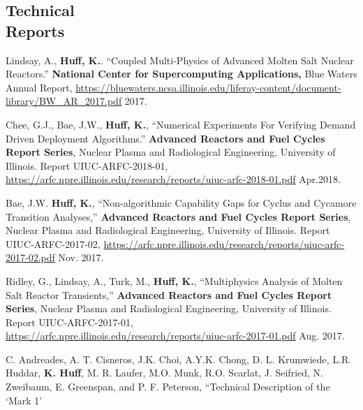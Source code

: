 \documentclass[margin,line]{resume}
\begin{document}
\begin{resume}
    \section{\mysidestyle Technical\\Reports}
    \begin{bibenum}
      \item Lindsay, A., \textbf{Huff, K.}. ``Coupled Multi-Physics of Advanced
              Molten Salt Nuclear Reactors.'' \textbf{National Center for
              Supercomputing Applications,} Blue Waters Annual Report,
              \url{https://bluewaters.ncsa.illinois.edu/liferay-content/document-library/BW_AR_2017.pdf}
              2017.
      \item Chee, G.J., Bae, J.W., \textbf{Huff, K.}, ``Numerical Experiments
              For Verifying Demand Driven Deployment Algorithms.''
              \textbf{Advanced Reactors and Fuel Cycles Report Series}, Nuclear Plasma and Radiological Engineering, University of Illinois.  Report
              UIUC-ARFC-2018-01,
              \url{https://arfc.npre.illinois.edu/research/reports/uiuc-arfc-2018-01.pdf}
              Apr.2018.
      \item Bae, J.W. \textbf{Huff, K.}, ``Non-algorithmic Capability Gaps for
              Cyclus and Cycamore Transition Analyses,'' \textbf{Advanced
              Reactors and Fuel Cycles Report Series}, Nuclear Plasma and
              Radiological Engineering, University of Illinois.  Report
              UIUC-ARFC-2017-02,
              \url{https://arfc.npre.illinois.edu/research/reports/uiuc-arfc-2017-02.pdf}
              Nov. 2017.
      \item Ridley, G., Lindsay, A., Turk, M., \textbf{Huff, K.}, ``Multiphysics
              Analysis of Molten Salt Reactor Transients,'' \textbf{Advanced
              Reactors and Fuel Cycles Report Series}, Nuclear Plasma and
              Radiological Engineering, University of Illinois.  Report
              UIUC-ARFC-2017-01,
              \url{https://arfc.npre.illinois.edu/research/reports/uiuc-arfc-2017-01.pdf}
              Aug. 2017.
      \item C. Andreades, A. T. Cisneros, J.K. Choi, A.Y.K. Chong, D. L.
              Krumwiede, L.R. Huddar, \textbf{K. Huff}, M. R. Laufer, M.O.
              Munk, R.O.  Scarlat, J. Seifried, N. Zweibaum, E. Greenspan, and
              P. F. Peterson, ``Technical Description of the ‘Mark 1’

\end{bibenum}
\end{resume}
\end{document}
